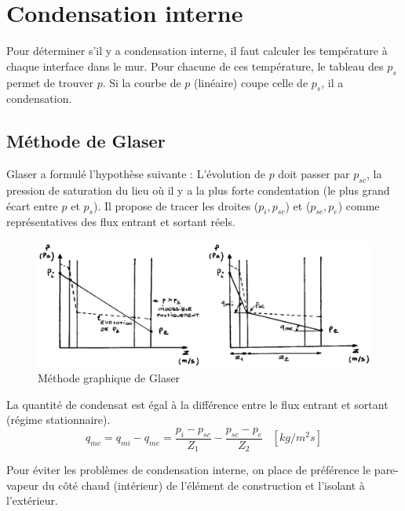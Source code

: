 \documentclass[11pt]{report}
\begin{document}
\section{Condensation interne}
Pour déterminer s'il y a condensation interne, il faut calculer les température à chaque interface dans le mur. Pour chacune de ces température, le tableau des $p_s$ permet de trouver $p$. Si la courbe de $p$ (linéaire) coupe celle de $p_s$, il a condensation.

\subsection{Méthode de Glaser}
Glaser a formulé l'hypothèse suivante : L'évolution de $p$ doit passer par $p_{sc}$, la pression de saturation du lieu où il y a la plus forte condentation (le plus grand écart entre $p$ et $p_s$). Il propose de tracer les droites ($p_i,p_{sc}$) et ($p_{sc},p_e$) comme représentatives des flux entrant et sortant réels.

\begin{figure}[h]
\begin{center}
\includegraphics[width=\linewidth]{pp}
\end{center}
\caption{Méthode graphique de Glaser}
\end{figure}

La quantité de condensat est égal à la différence entre le flux entrant et sortant (régime stationnaire). 
$$q_{mc}=q_{mi}-q_{me} = \frac{p_i-p_{sc}}{Z_1}-\frac{p_{sc}-p_e}{Z_2}\;\;\;[kg/m^2 s]$$

Pour éviter les problèmes de condensation interne, on place de préférence le pare-vapeur du côté chaud (intérieur) de l'élément de construction et l'isolant à l'extérieur.


\newpage
\end{document}
